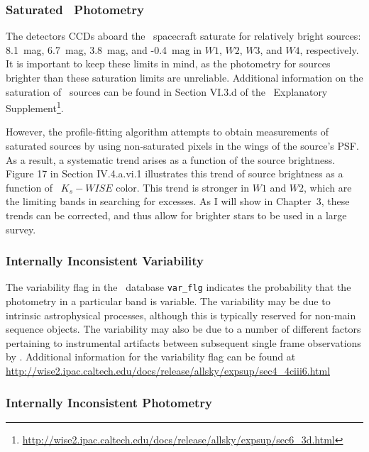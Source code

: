     
        \subsubsection{Saturated \WS\ Photometry}
    The detectors CCDs aboard the \WS\ spacecraft saturate for relatively bright sources: 8.1~mag, 6.7~mag, 3.8~mag, and -0.4~mag in $W1$, $W2$, $W3$, and $W4$, respectively. It is important to keep these limits in mind, as the photometry for sources brighter than these saturation limits are unreliable. Additional information on the saturation of \WS\ sources can be found in Section VI.3.d of the \WS\ Explanatory Supplement\footnote{\url{http://wise2.ipac.caltech.edu/docs/release/allsky/expsup/sec6_3d.html}}. 
    
    However, the profile-fitting algorithm attempts to obtain measurements of saturated sources by using non-saturated pixels in the wings of the source's PSF. As a result, a systematic trend arises as a function of the source brightness. Figure 17 in Section IV.4.a.vi.1 illustrates this trend of source brightness as a function of \mass\ $K_s-WISE$ color. This trend is stronger in $W1$ and $W2$, which are the limiting bands in searching for excesses. As I will show in Chapter~3, these trends can be corrected, and thus allow for brighter stars to be used in a large survey. 
    
    
        \subsubsection{Internally Inconsistent Variability}
    
    The variability flag in the \WS\ database \verb|var_flg| indicates the probability that the photometry in a particular band is variable. The variability may be due to intrinsic astrophysical processes, although this is typically reserved for non-main sequence objects. The variability may also be due to a number of different factors pertaining to instrumental artifacts between subsequent single frame observations by \WS. Additional information for the variability flag can be found at \url{http://wise2.ipac.caltech.edu/docs/release/allsky/expsup/sec4_4ciii6.html}
    
        \subsubsection{Internally Inconsistent Photometry}
    
